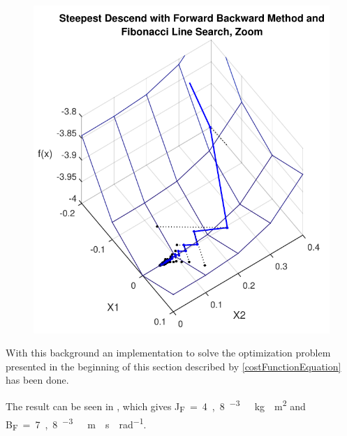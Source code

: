\begin{minipage}{\linewidth}
\begin{minipage}{0.45\linewidth}
\begin{figure}[H]
			\includegraphics[scale=.62]{figures/gradientForwardBackwardAndFibonacciZoom}
			\centering
			\captionsetup{justification=centering}
			\label{gradientForwardBackwardAndFibonacciZoom}
		\end{figure}
	\end{minipage}
\end{minipage}

With this background an implementation to solve the optimization problem presented in the beginning of this section described by \eqref{costFunctionEquation} has been done.

The result can be seen in , which gives \si{J_F=4,8 ^{-3}\ kg \cdot m^2} and \si{B_F=7,8 ^{-3}\ m \cdot s \cdot rad^{-1}}.

